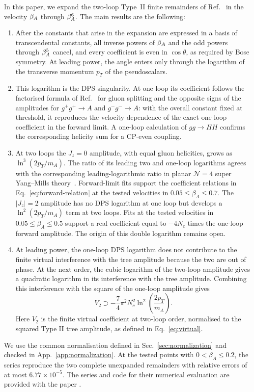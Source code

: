 In this paper, we expand the two-loop Type~II finite remainders of Ref.~\cite{Bhattacharya:2019bmd} in the velocity $\beta_A$ through $\beta_A^6$. The main results are the following:
\begin{enumerate}
 \item After the constants that arise in the expansion are expressed in a basis of \BasisCountWord{} transcendental constants, all inverse powers of $\beta_A$ and the odd powers through $\beta_A^5$ cancel, and every coefficient is even in $\cos\theta$, as required by Bose symmetry. At leading power, the angle enters only through the logarithm of the transverse momentum $p_T$ of the pseudoscalars.

 \item This logarithm is the DPS singularity. At one loop its coefficient follows the factorised formula of Ref.~\cite{GauntStirling2011} for gluon splitting and the opposite signs of the amplitudes for $g^+g^+\to A$ and $g^-g^-\to A$: with the overall constant fixed at threshold, it reproduces the velocity dependence of the exact one-loop coefficient in the forward limit. A one-loop calculation of $gg\to HH$ confirms the corresponding helicity sum for a CP-even coupling.

 \item At two loops the $J_z=0$ amplitude, with equal gluon helicities, grows as $\ln^3(2p_T/m_A)$. The ratio of its leading two and one-loop logarithms agrees with the corresponding leading-logarithmic ratio in planar $\mathcal{N}=4$ super Yang--Mills theory~\cite{DixonEsterlis2016,DixonEsterlis2016Erratum}. Forward-limit fits support the coefficient relations in Eq.\ \eqref{eq:forward-relation} at the tested velocities in $0.05\leq\beta_A\leq0.7$. The $|J_z|=2$ amplitude has no DPS logarithm at one loop but develops a $\ln^2(2p_T/m_A)$ term at two loops. Fits at the tested velocities in $0.05\leq\beta_A\leq0.5$ support a real coefficient equal to $-4N_c$ times the one-loop forward amplitude. The origin of this double logarithm remains open.

 \item At leading power, the one-loop DPS logarithm does not contribute to the finite virtual interference with the tree amplitude because the two are out of phase. At the next order, the cubic logarithm of the two-loop amplitude gives a quadratic logarithm in its interference with the tree amplitude. Combining this interference with the square of the one-loop amplitude gives
 \[V_2\supset-\frac{7}{4}\pi^2N_c^2 \ln^2\left(\frac{2p_T}{m_A}\right). \]
 Here $V_2$ is the finite virtual coefficient at two-loop order, normalised to the squared Type II tree amplitude, as defined in Eq.~\eqref{eq:virtual}.
\end{enumerate}
%
We use the common normalisation defined in Sec.~\ref{sec:normalization} and checked
in App.~\ref{app:normalization}. At the tested points with $0<\beta_A\leq0.2$, the series reproduce the two complete unexpanded remainders with relative errors of at most $6.77\times10^{-5}$. The series and code for their numerical evaluation are provided with the paper \cite{SupplementalMaterial}.

